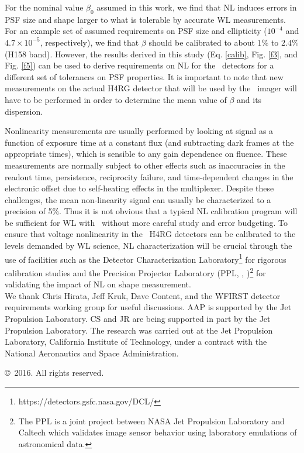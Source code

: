 \documentclass[preprint]{aastex}
\begin{document}
For the nominal value $\beta_0$ assumed in this work, we find that NL induces errors in PSF size and shape larger to what is tolerable by accurate WL measurements. For an example set of assumed requirements on PSF size and ellipticity ($10^{-4}$  and $4.7\times 10^{-5}$, respectively), we find that  $\beta$ should be calibrated to about $1\%$ to $2.4\%$ (H158 band). However, the results derived in this study (Eq. \ref{calib}, Fig. \ref{f3}, and Fig. \ref{f5}) can be used to derive requirements on NL for the \wfa\ detectors for a different set of tolerances on PSF properties. It is important to note that new measurements on the actual H4RG detector that will be used by the \wf\ imager will have to be performed in order to determine the mean value of $\beta$ and its dispersion.

Nonlinearity measurements are usually performed by looking at signal as a function of exposure time at a constant flux (and subtracting dark frames at the appropriate times), which is sensible to any gain dependence on fluence. These measurements are normally subject to other effects such as inaccuracies in the readout time, persistence, reciprocity failure, and time-dependent changes in the electronic offset due to self-heating effects in the multiplexer. Despite these challenges, the mean non-linearity signal can usually be characterized to a precision of 5$\%$. Thus it is not obvious that a typical NL calibration program will be sufficient for WL with \wf\ without more careful study and error budgeting.
To ensure that voltage nonlinearity in the \wf\ H4RG detectors can be calibrated to the levels demanded by WL science, NL characterization will be crucial through the use of facilities such as the Detector Characterization Laboratory\footnote{https://detectors.gsfc.nasa.gov/DCL/} for rigorous calibration studies and the 
Precision Projector Laboratory (PPL, \citealt{seshadri13}, \citealt{shapiro13})\footnote{The PPL is a joint project between NASA Jet Propulsion Laboratory and Caltech which validates image sensor behavior using laboratory emulations of astronomical data.} for validating the impact of NL on shape measurement.\\

We thank Chris Hirata, Jeff Kruk, Dave Content, and the WFIRST detector requirements working group for useful discussions. AAP is supported by the Jet Propulsion Laboratory. CS and JR are being supported in part by the Jet Propulsion Laboratory. The research was carried out at the Jet Propulsion Laboratory, California Institute of Technology, under a contract with the National Aeronautics and Space Administration.

\copyright\ 2016. All rights reserved.





\acknowledgments


\end{document}
